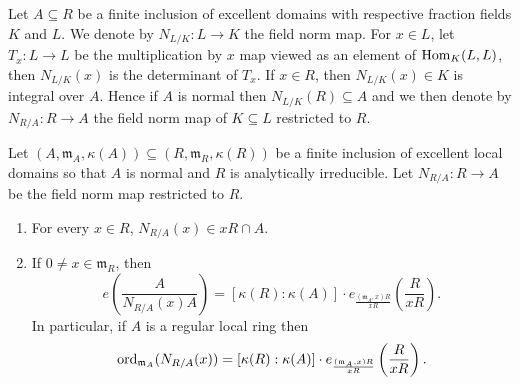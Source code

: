 \documentclass[12pt]{amsart}
\numberwithin{equation}{theorem}
\theoremstyle{plain}
\newcommand{\fm}{\mathfrak{m}}
\begin{document}



Let $A\subseteq R$ be a finite inclusion of excellent domains with respective fraction fields $K$ and $L$. We denote by $N_{L/K}:L\to K$ the field norm map. For $x\in L$, let $T_x:L\to L$ be the multiplication by $x$ map viewed as an element of $\operatorname{Hom}_K(L,L)$, then $N_{L/K}(x)$ is the determinant of $T_x$. If $x\in R$, then $N_{L/K}(x)\in K$ is integral over $A$. Hence if $A$ is normal then $N_{L/K}(R)\subseteq A$ and we then denote by $N_{R/A}:R\to A$ the field norm map of $K\subseteq L$ restricted to $R$.


\begin{lemma}
    \label{lem: Field norm map lemma}
    Let $(A,\fm_A,\kappa(A))\subseteq (R,\fm_R,\kappa(R))$ be a finite inclusion of excellent local domains so that $A$ is normal and $R$ is analytically irreducible. Let $N_{R/A}:R\to A$ be the field norm map restricted to $R$.
    \begin{enumerate}
        \item For every $x\in R$, $N_{R/A}(x)\in xR\cap A$.
        \item If $0\not=x\in \fm_R$, then 
        \[
        e\left(\frac{A}{N_{R/A}(x)A}\right) = [\kappa(R):\kappa(A)] \cdot e_{\frac{(\fm_A,x)R}{xR}}\left(\frac{R}{x R}\right).
        \]
        In particular, if $A$ is a regular local ring then
        \[
        \ord_{\fm_A}(N_{R/A}(x)) = [\kappa(R):\kappa(A)] \cdot e_{\frac{(\fm_A,x)R}{xR}}\left(\frac{R}{x R}\right).
        \]
    \end{enumerate}
\end{lemma}
\end{document}
